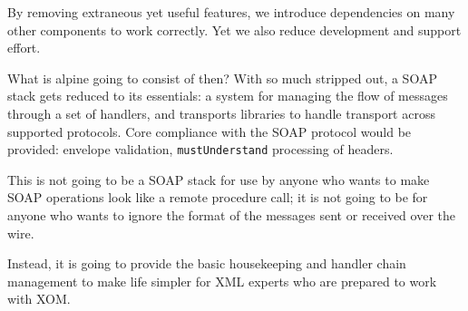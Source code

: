 By removing extraneous yet useful features, we introduce dependencies
on many other components to work correctly. Yet we also reduce
development and support effort.

What is alpine going to consist of then? With so much stripped out, a
SOAP stack gets reduced to its essentials: a system for managing the
flow of messages through a set of handlers, and transports libraries
to handle transport across supported protocols. Core compliance with
the SOAP protocol would be provided: envelope validation,
\verb|mustUnderstand| processing of headers. 

This is not going to be a SOAP stack for use by anyone who wants to
make SOAP operations look like a remote procedure call; it is not
going to be for anyone who wants to ignore the format of the messages
sent or received over the wire.

Instead, it is going to provide the basic housekeeping and handler
chain management to make life simpler for XML experts who are prepared
to work with XOM.
